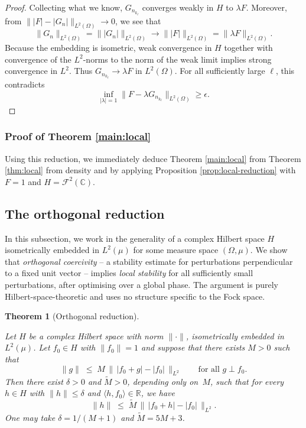 \documentclass[11pt]{amsart}
\newtheorem{theorem}{Theorem}[section]
\theoremstyle{remark}
\begin{document}
\begin{proof}
Collecting what we know, \(G_{n_{k_\ell}}\) converges weakly in \(H\) to
\(\lambda F\). Moreover, from
\(\lVert \lvert F \rvert-\lvert G_n \rvert \rVert_{L^2(\Omega)}\to0\), we see that
\[
\lVert G_n \rVert_{L^2(\Omega)}=\lVert \lvert G_n \rvert \rVert_{L^2(\Omega)}
\to
\lVert \lvert F \rvert \rVert_{L^2(\Omega)}
=\lVert \lambda F \rVert_{L^2(\Omega)}.
\]
Because the embedding is isometric, weak convergence in \(H\) together with
convergence of the \(L^2\)-norms to the norm of the weak limit implies strong
convergence in \(L^2\). Thus \(G_{n_{k_\ell}}\to\lambda F\) in
\(L^2(\Omega)\). For all sufficiently large \(\ell\), this contradicts
\[
\inf_{\lvert \lambda \rvert=1}
\lVert F-\lambda G_{n_{k_\ell}} \rVert_{L^2(\Omega)}
\ge \epsilon.
\]
\end{proof}
\subsubsection{Proof of Theorem \ref{main:local}} Using this reduction, we immediately deduce Theorem \ref{main:local} from Theorem \ref{thm:local} from density and by applying Proposition \ref{prop:local-reduction} with $F=1$ and $H=\mathcal{F}^2(\mathbb{C})$.
\subsection{The orthogonal reduction}\label{subsec:reduction}
In this subsection, we work in the generality of a complex Hilbert space $H$
isometrically embedded in $L^2(\mu)$ for some measure space $(\Omega, \mu)$.
We show that \emph{orthogonal coercivity} -- a stability estimate for
perturbations perpendicular to a fixed unit vector -- implies \emph{local
stability} for all sufficiently small perturbations, after optimising over a
global phase.  The argument is purely Hilbert-space-theoretic and uses no
structure specific to the Fock space. 

\begin{theorem}[Orthogonal reduction]\label{thm:reduction}
\par
Let $H$ be a complex Hilbert space with norm $\lVert \cdot \rVert$, isometrically
embedded in $L^2(\mu)$.  Let $f_0 \in H$ with $\lVert f_0 \rVert = 1$ and
suppose that there exists $M > 0$ such that
\begin{equation}\label{eq:orthog-hyp}
\lVert g \rVert
\;\le\;
M\, \bigl\|\, \lvert f_0 + g \rvert - \lvert f_0 \rvert \,\bigr\|_{L^2}
\qquad
\text{for all } g \perp f_0.
\end{equation}
Then there exist $\delta > 0$ and $\widetilde{M} > 0$, depending only
on~$M$, such that
for every $h \in H$ with $\lVert h \rVert \le \delta$ and
$\langle h,f_0\rangle \in \mathbb{R}$, we have
\[
\lVert h \rVert
\;\le\;
\widetilde{M}\, \bigl\|\, \lvert f_0 + h \rvert - \lvert f_0 \rvert \,\bigr\|_{L^2}.
\]
One may take $\delta = 1/(M+1)$ and $\widetilde{M} = 5M + 3$.
\end{theorem}
\end{document}
